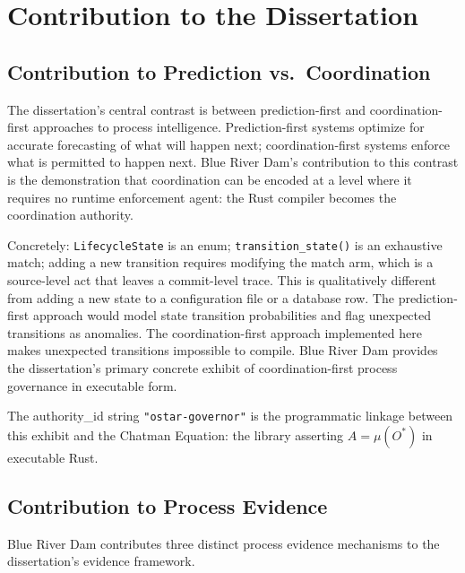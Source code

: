 
\section{Contribution to the Dissertation}
\label{sec:blue-river-dam-contribution}

\subsection{Contribution to Prediction vs.~Coordination}
\label{sec:blue-river-dam-contribution-prediction}

The dissertation's central contrast is between prediction-first and
coordination-first approaches to process intelligence. Prediction-first systems
optimize for accurate forecasting of what will happen next; coordination-first
systems enforce what is permitted to happen next. Blue River Dam's contribution
to this contrast is the demonstration that coordination can be encoded at a
level where it requires no runtime enforcement agent: the Rust compiler becomes
the coordination authority.

Concretely: \texttt{LifecycleState} is an enum; \texttt{transition\_state()} is
an exhaustive match; adding a new transition requires modifying the match arm,
which is a source-level act that leaves a commit-level trace. This is
qualitatively different from adding a new state to a configuration file or a
database row. The prediction-first approach would model state transition
probabilities and flag unexpected transitions as anomalies. The
coordination-first approach implemented here makes unexpected transitions
impossible to compile. Blue River Dam provides the dissertation's primary
concrete exhibit of coordination-first process governance in executable form.

The authority\_id string \texttt{"ostar-governor"} is the programmatic
linkage between this exhibit and the Chatman Equation: the library asserting
$A = \mu(O^*)$ in executable Rust.

\subsection{Contribution to Process Evidence}
\label{sec:blue-river-dam-contribution-evidence}

Blue River Dam contributes three distinct process evidence mechanisms to the
dissertation's evidence framework.

